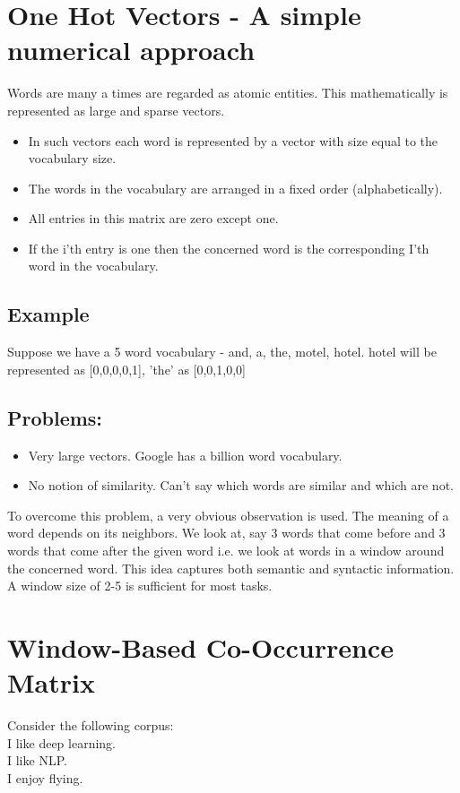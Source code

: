 \documentclass{article}
\begin{document}
\section{One Hot Vectors - A simple numerical approach}
\hspace{10pt}Words are many a times are regarded as atomic entities. This mathematically is represented as large and sparse vectors.
\begin{itemize}
    \item In such vectors each word is represented by a vector with size equal to the vocabulary size.
    \item The words in the vocabulary are arranged in a fixed order (alphabetically).  
    \item All entries in this matrix are zero except one.
    \item If the i'th entry is one then the concerned word is the corresponding I'th word in the vocabulary.
\end{itemize}

\subsection{Example}
Suppose we have a 5 word vocabulary - and, a, the, motel, hotel.
hotel will be represented as [0,0,0,0,1], 'the' as [0,0,1,0,0]\\
\subsection{Problems:}
\begin{itemize}
    \item Very large vectors. Google has a billion word vocabulary.
    \item  No notion of similarity. Can't say which words are similar and which are not. 
\end{itemize}

To overcome this problem, a very obvious observation is used. The meaning of a word depends on its neighbors. We look at, say 3 words that come before and 3 words that come after the given word i.e. we look at words in a window around the concerned word. This idea captures both semantic and syntactic information.
A window size of 2-5 is sufficient for most tasks.

\section{Window-Based Co-Occurrence Matrix}
Consider the following corpus:\\
I like deep learning.\\
I like NLP.\\
I enjoy flying.\\
\end{document}
